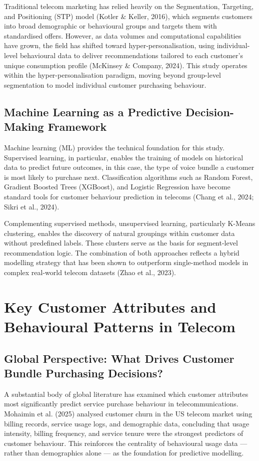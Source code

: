 Traditional telecom marketing has relied heavily on the Segmentation, Targeting, and Positioning (STP) model (Kotler \& Keller, 2016), which segments customers into broad demographic or behavioural groups and targets them with standardised offers. However, as data volumes and computational capabilities have grown, the field has shifted toward hyper-personalisation, using individual-level behavioural data to deliver recommendations tailored to each customer's unique consumption profile (McKinsey \& Company, 2024). This study operates within the hyper-personalisation paradigm, moving beyond group-level segmentation to model individual customer purchasing behaviour.


\subsection{Machine Learning as a Predictive Decision-Making Framework}

Machine learning (ML) provides the technical foundation for this study. Supervised learning, in particular, enables the training of models on historical data to predict future outcomes, in this case, the type of voice bundle a customer is most likely to purchase next. Classification algorithms such as Random Forest, Gradient Boosted Trees (XGBoost), and Logistic Regression have become standard tools for customer behaviour prediction in telecoms (Chang et al., 2024; Sikri et al., 2024).

Complementing supervised methods, unsupervised learning, particularly K-Means clustering, enables the discovery of natural groupings within customer data without predefined labels. These clusters serve as the basis for segment-level recommendation logic. The combination of both approaches reflects a hybrid modelling strategy that has been shown to outperform single-method models in complex real-world telecom datasets (Zhao et al., 2023).


\section{Key Customer Attributes and Behavioural Patterns in Telecom}


\subsection{Global Perspective: What Drives Customer Bundle Purchasing Decisions?}

A substantial body of global literature has examined which customer attributes most significantly predict service purchase behaviour in telecommunications. Mohaimin et al. (2025) analysed customer churn in the US telecom market using billing records, service usage logs, and demographic data, concluding that usage intensity, billing frequency, and service tenure were the strongest predictors of customer behaviour. This reinforces the centrality of behavioural usage data --- rather than demographics alone --- as the foundation for predictive modelling.

